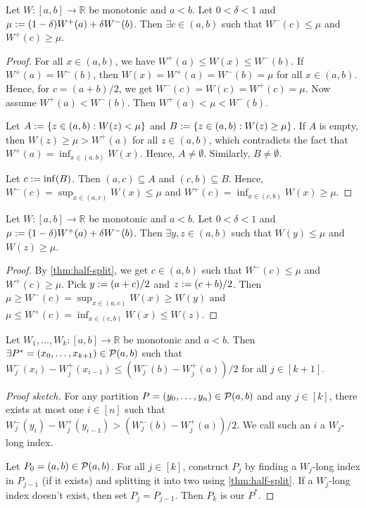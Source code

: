 \documentclass[a4paper,12pt,fleqn]{article}
\begin{document}
\begin{lemma}
\label{thm:half-split}
Let $W: [a, b] \to \mathbb{R}$ be monotonic and $a < b$.
Let $0 < \delta < 1$ and $\mu := (1-\delta) W^+(a) + \delta W^-(b)$.
Then $\exists c \in (a, b)$ such that $W^-(c) \le \mu$ and $W^+(c) \ge \mu$.
\end{lemma}
\begin{proof}
For all $x \in (a, b)$, we have $W^+(a) \le W(x) \le W^-(b)$.
If $W^+(a) = W^-(b)$, then $W(x) = W^+(a) = W^-(b) = \mu$ for all $x \in (a, b)$.
Hence, for $c = (a+b)/2$, we get $W^-(c) = W(c) = W^+(c) = \mu$.
Now assume $W^+(a) < W^-(b)$. Then $W^+(a) < \mu < W^-(b)$.

Let $A := \{z \in (a, b): W(z) < \mu\}$
and $B := \{z \in (a, b): W(z) \ge \mu\}$.
If $A$ is empty, then $W(z) \ge \mu > W^+(a)$ for all $z \in (a, b)$,
which contradicts the fact that $W^+(a) = \inf_{x \in (a, b)} W(x)$.
Hence, $A \neq \emptyset$. Similarly, $B \neq \emptyset$.

Let $c := \inf(B)$. Then $(a, c) \subseteq A$ and $(c, b) \subseteq B$.
Hence, $W^-(c) = \sup_{x \in (a, c)} W(x) \le \mu$
and $W^+(c) = \inf_{x \in (c, b)} W(x) \ge \mu$.
\end{proof}

\begin{lemma}
\label{thm:half-split-2}
Let $W: [a, b] \to \mathbb{R}$ be monotonic and $a < b$.
Let $0 < \delta < 1$ and $\mu := (1-\delta) W^+(a) + \delta W^-(b)$.
Then $\exists y, z \in (a, b)$ such that $W(y) \le \mu$ and $W(z) \ge \mu$.
\end{lemma}
\begin{proof}
By \cref{thm:half-split}, we get $c \in (a, b)$ such that
$W^-(c) \le \mu$ and $W^+(c) \ge \mu$.
Pick $y := (a+c)/2$ and $z := (c+b)/2$.
Then $\mu \ge W^-(c) = \sup_{x \in (a, c)} W(x) \ge W(y)$
and $\mu \le W^+(c) = \inf_{x \in (c, b)} W(x) \le W(z)$.
\end{proof}

\begin{lemma}
\label{thm:k-split}
Let $W_1, \ldots, W_k: [a, b] \to \mathbb{R}$ be monotonic and $a < b$.
Then $\exists P^* = (x_0, \ldots, x_{k+1}) \in \mathcal{P}(a, b)$ such that
$W_j^-(x_i) - W_j^+(x_{i-1}) \le (W_j^-(b) - W_j^+(a))/2$ for all $j \in [k+1]$.
\end{lemma}
\begin{proof}[Proof sketch]
For any partition $P = (y_0, \ldots, y_n) \in \mathcal{P}(a, b)$ and any $j \in [k]$,
there exists at most one $i \in [n]$ such that
$W_j^-(y_i) - W_j^+(y_{i-1}) > (W_j^-(b) - W_j^+(a))/2$.
We call such an $i$ a $W_j$-long index.

Let $P_0 = (a, b) \in \mathcal{P}(a, b)$.
For all $j \in [k]$, construct $P_j$ by finding a $W_j$-long index in $P_{j-1}$
(if it exists) and splitting it into two using \cref{thm:half-split}.
If a $W_j$-long index doesn't exist, then set $P_j = P_{j-1}$.
Then $P_k$ is our $P^*$.
\end{proof}
\end{document}

